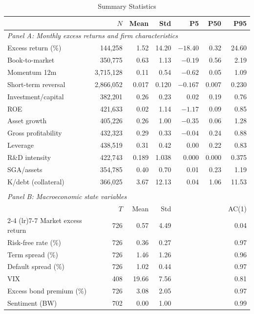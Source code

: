 \begin{table}[H]
\centering
\caption{Summary Statistics}
\label{tab:summary}
\footnotesize\setlength{\tabcolsep}{4pt}
\begin{tabular}{lrrrrrr}
\toprule
 & $N$ & Mean & Std & P5 & P50 & P95 \\
\midrule
\multicolumn{7}{l}{\textit{Panel A: Monthly excess returns and firm characteristics}} \\
Excess return (\%) & 144,258 & 1.52 & 14.20 & $-18.40$ & 0.32 & 24.60 \\
Book-to-market & 350,775 & 0.63 & 1.13 & $-0.19$ & 0.56 & 2.19 \\
Momentum 12m & 3,715,128 & 0.11 & 0.54 & $-0.62$ & 0.05 & 1.09 \\
Short-term reversal & 2,866,052 & 0.017 & 0.120 & $-0.167$ & 0.007 & 0.230 \\
Investment/capital & 382,201 & 0.26 & 0.23 & 0.02 & 0.19 & 0.76 \\
ROE & 421,633 & 0.02 & 1.14 & $-1.17$ & 0.09 & 0.85 \\
Asset growth & 405,226 & 0.26 & 1.00 & $-0.35$ & 0.06 & 1.28 \\
Gross profitability & 432,323 & 0.29 & 0.33 & $-0.04$ & 0.24 & 0.88 \\
Leverage & 438,519 & 0.31 & 0.42 & 0.00 & 0.22 & 0.83 \\
R\&D intensity & 422,743 & 0.189 & 1.038 & 0.000 & 0.000 & 0.375 \\
SGA/assets & 354,785 & 0.40 & 0.70 & 0.01 & 0.23 & 1.19 \\
K/debt (collateral) & 366,025 & 3.67 & 12.13 & 0.04 & 1.06 & 11.53 \\
\\[2pt]
\multicolumn{7}{l}{\textit{Panel B: Macroeconomic state variables}} \\
 & $T$ & Mean & Std & & & AC(1) \\
\cmidrule(lr){2-4} \cmidrule(lr){7-7}
Market excess return & 726 & 0.57 & 4.49 & & & 0.04 \\
Risk-free rate (\%) & 726 & 0.36 & 0.27 & & & 0.97 \\
Term spread (\%) & 726 & 1.46 & 1.26 & & & 0.96 \\
Default spread (\%) & 726 & 1.02 & 0.44 & & & 0.97 \\
VIX & 408 & 19.66 & 7.56 & & & 0.81 \\
Excess bond premium (\%) & 726 & 3.08 & 2.05 & & & 0.97 \\
Sentiment (BW) & 702 & 0.00 & 1.00 & & & 0.99 \\

\end{tabular}
\end{table}
